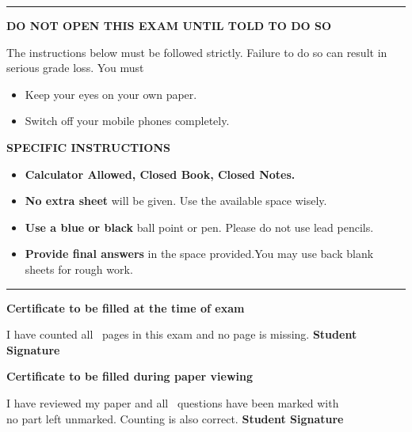 \documentclass[11pt]{exam}
\begin{document}
\noindent\rule{\textwidth}{1pt}
\small
\begin{center}
\textbf{DO  NOT  OPEN  THIS  EXAM  UNTIL  TOLD  TO  DO  SO}
\end{center}
The instructions below must be followed strictly. Failure to do so can result in serious grade loss. You must
\begin{itemize}
  \item Keep your eyes on your own paper.
  \item Switch off your mobile phones completely.
\end{itemize}
\begin{center}
\textbf{SPECIFIC INSTRUCTIONS}
\end{center}
\begin{itemize}
\item \textbf{Calculator Allowed, Closed Book, Closed Notes.}
\item \textbf{No extra sheet} will be given. Use the available space wisely.
\item \textbf{Use a blue or black} ball point or pen. Please do not use lead pencils.
\item \textbf{Provide final answers} in the space provided.You may use back blank sheets for rough work.
\end{itemize}
\noindent\rule{\textwidth}{1pt}

\begin{center}
\textbf{Certificate to be filled at the time of exam}
\end{center}

I have counted all \numpages\ pages in this exam and no page is missing. \hfill \textbf{Student Signature}

\begin{center}
\vspace{0pt}
\cellwidth{3em}
\addpoints %
\gradetable[h][questions]%

\end{center}

\begin{center}
\textbf{Certificate to be filled during paper viewing}
\end{center}

I have reviewed my paper and all \numquestions\ questions have been marked with\\ no
 part left unmarked. Counting is also correct. \hfill \textbf{Student Signature}
\end{document}
